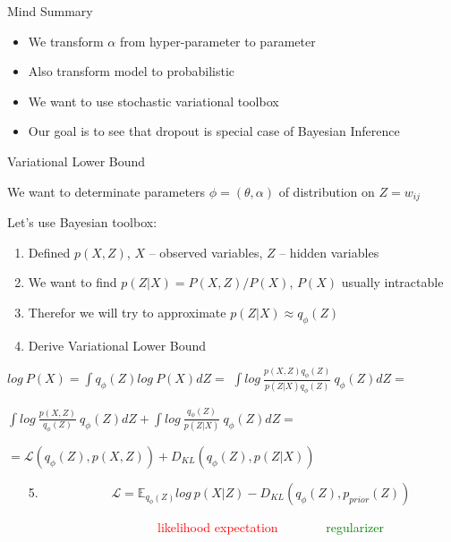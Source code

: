 \documentclass{beamer}
\begin{document}
\begin{frame}{Mind Summary}
	\begin{itemize}
		\item We transform $\alpha$ from hyper-parameter to parameter
		\item Also transform model to probabilistic  
		\item We want to use stochastic variational toolbox 
		\item Our goal is to see that dropout  is special case of Bayesian Inference
	\end{itemize}

\end{frame}


\begin{frame}{Variational Lower Bound}
	
	We want to determinate parameters $\phi = (\theta, \alpha)$ of distribution on $Z=w_{ij}$
	\vspace{0.2cm}
	
	 Let's use Bayesian  toolbox:
	\begin{enumerate}
		 \item Defined $p(X, Z)$, $X$ -- observed variables, $Z$ -- hidden variables 
		 \item We want to find $p(Z|X) = P(X, Z) / P(X)$, $P(X)$ usually intractable 
		 \item Therefor we will try to approximate $p(Z|X) \approx q_\phi(Z)$
		 \item Derive Variational Lower Bound		 
	\end{enumerate}
			\begin{center}
			 $log~P(X) =  \int q_\phi(Z) log~P(X) dZ =$  
			 $\int log~\frac{p(X, Z)q_\phi(Z)}{p(Z|X)q_\phi(Z)}~q_\phi(Z) dZ = $ 
			
			 $\int log~\frac{p(X, Z)}{q_\phi(Z)}~q_\phi(Z) dZ  + \int log~\frac{q_\phi(Z)}{p(Z|X)}~q_\phi(Z) dZ = $
			\vspace{0.2cm}
			
			 $= \mathcal{L}(q_\phi(Z), p(X, Z)) +  D_{KL}(q_\phi(Z), p(Z|X))$
			\end{center}
			
	
	\vspace{-0.4cm}
	
	\begin{enumerate}
		\item[5.] ~~~~~~~~~~~$\mathcal{L} = \mathds{E}_{q_\phi(Z)} log~p(X|Z) - D_{KL}(q_\phi(Z), p_{prior}(Z))$
	\end{enumerate}
	
	~~~~~~~~~~~~~~~~~~~~~~~~\textcolor{red}{likelihood expectation}~~~~~~~	\textcolor{green}{regularizer}
\end{frame}
\end{document}
